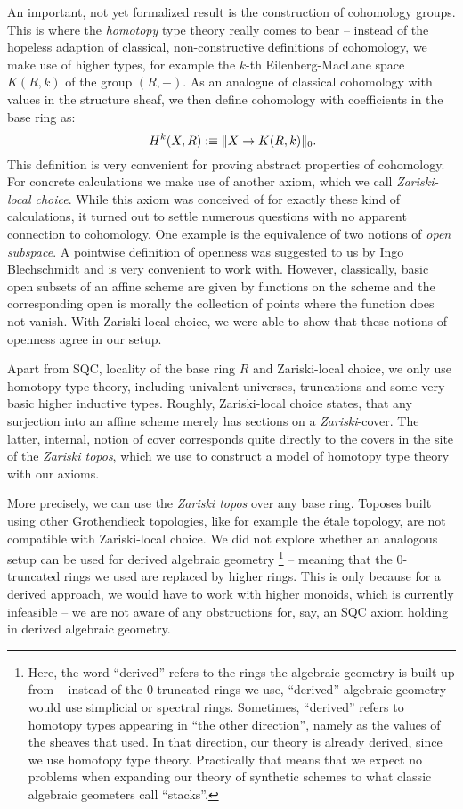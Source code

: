 An important, not yet formalized result
is the construction of cohomology groups.
This is where the \emph{homotopy} type theory really comes to bear --
instead of the hopeless adaption of classical, non-constructive definitions of cohomology,
we make use of higher types,
for example the $k$-th Eilenberg-MacLane space $K(R,k)$ of the group $(R,+)$.
As an analogue of classical cohomology with values in the structure sheaf,
we then define cohomology with coefficients in the base ring as:
\[
  H^k(X,R):\equiv \|X\to K(R,k)\|_0
  \rlap{.}
\]
This definition is very convenient for proving abstract properties of cohomology.
For concrete calculations we make use of another axiom,
which we call \emph{Zariski-local choice}.
While this axiom was conceived of for exactly these kind of calculations,
it turned out to settle numerous questions with no apparent connection to cohomology.
One example is the equivalence of two notions of \emph{open subspace}.
A pointwise definition of openness was suggested to us by Ingo Blechschmidt and
is very convenient to work with.
However, classically, basic open subsets of an affine scheme are given
by functions on the scheme and the corresponding open is morally the collection of points where the function does not vanish.
With Zariski-local choice, we were able to show that these notions of openness agree in our setup.

Apart from SQC, locality of the base ring $R$ and Zariski-local choice,
we only use homotopy type theory, including univalent universes, truncations and some very basic higher inductive types.
Roughly, Zariski-local choice states, that any surjection into an affine scheme merely has sections on a \emph{Zariski}-cover.
The latter, internal, notion of cover corresponds quite directly to the covers in the site of the \emph{Zariski topos},
which we use to construct a model of homotopy type theory with our axioms.

More precisely, we can use the \emph{Zariski topos} over any base ring.
Toposes built using other Grothendieck topologies, like for example the étale topology, are not compatible with Zariski-local choice.
We did not explore whether an analogous setup can be used for derived algebraic geometry
\footnote{Here, the word ``derived'' refers to the rings the algebraic geometry is built up from -- instead of the 0-truncated rings we use, ``derived'' algebraic geometry would use simplicial or spectral rings.
  Sometimes, ``derived'' refers to homotopy types appearing in ``the other direction'', namely as the values of the sheaves that used.
  In that direction, our theory is already derived, since we use homotopy type theory.
  Practically that means that we expect no problems when expanding our theory of synthetic schemes to what classic algebraic geometers
  call ``stacks''.
}
-- meaning that the 0-truncated rings we used are replaced by higher rings.
This is only because for a derived approach, we would have to work with higher monoids, which is currently infeasible
-- we are not aware of any obstructions for, say, an SQC axiom holding in derived algebraic geometry.

